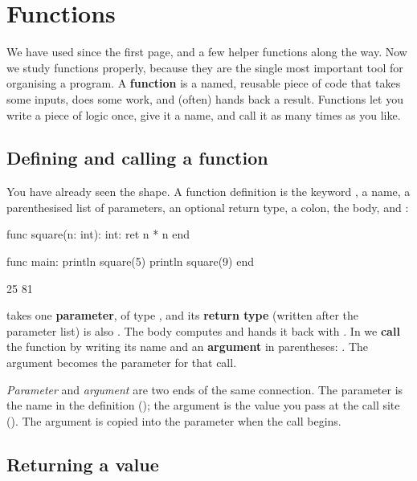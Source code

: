\chapter{Functions}%
\label{ch:functions}

We have used  since the first page, and a few helper functions along
the way. Now we study functions properly, because they are the single most
important tool for organising a program. A \textbf{function} is a named,
reusable piece of code that takes some inputs, does some work, and (often) hands
back a result. Functions let you write a piece of logic once, give it a name,
and call it as many times as you like.

\section{Defining and calling a function}

You have already seen the shape. A function definition is the keyword
, a name, a parenthesised list of parameters, an optional return
type, a colon, the body, and :

\begin{salamen}
func square(n: int): int:
    ret n * n
end

func main:
    println square(5)
    println square(9)
end
\end{salamen}

\begin{progout}
25
81
\end{progout}

 takes one \textbf{parameter},  of type , and its
\textbf{return type} (written after the parameter list) is also . The
body computes  and hands it back with . In  we
\textbf{call} the function by writing its name and an \textbf{argument} in
parentheses: . The argument  becomes the parameter
 for that call.

\begin{note}
\emph{Parameter} and \emph{argument} are two ends of the same connection. The
parameter is the name in the definition (); the argument is the value you
pass at the call site (). The argument is copied into the parameter when
the call begins.
\end{note}

\section{Returning a value}

